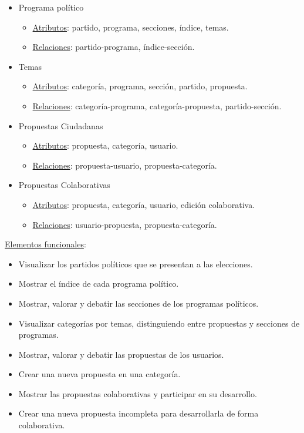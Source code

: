 \begin{itemize}
 \item Programa político
 \begin{itemize}
  \item \underline{Atributos}: partido, programa, secciones, índice, temas.
  \item \underline{Relaciones}: partido-programa, índice-sección.
 \end{itemize}
\end{itemize}

\begin{itemize}
 \item Temas
 \begin{itemize}
  \item \underline{Atributos}: categoría, programa, sección, partido, propuesta.
  \item \underline{Relaciones}: categoría-programa, categoría-propuesta, partido-sección.
 \end{itemize}
\end{itemize}

\begin{itemize}
 \item Propuestas Ciudadanas
 \begin{itemize}
  \item \underline{Atributos}: propuesta, categoría, usuario.
  \item \underline{Relaciones}: propuesta-usuario, propuesta-categoría.
 \end{itemize}
\end{itemize}

\begin{itemize}
 \item Propuestas Colaborativas
 \begin{itemize}
  \item \underline{Atributos}: propuesta, categoría, usuario, edición colaborativa.
  \item \underline{Relaciones}:  usuario-propuesta, propuesta-categoría.
 \end{itemize}
\end{itemize}

\underline{Elementos funcionales}:

 \begin{itemize}
  \item Visualizar los partidos políticos que se presentan a las elecciones.
  \item Mostrar el índice de cada programa político.
  \item Mostrar, valorar y debatir las secciones de los programas políticos.
  \item Visualizar categorías por temas, distinguiendo entre propuestas y secciones de programas.
  \item Mostrar, valorar y debatir las propuestas de los usuarios.
  \item Crear una nueva propuesta en una categoría.
  \item Mostrar las propuestas colaborativas y participar en su desarrollo.
  \item Crear una nueva propuesta incompleta para desarrollarla de forma colaborativa.
 \end{itemize}

